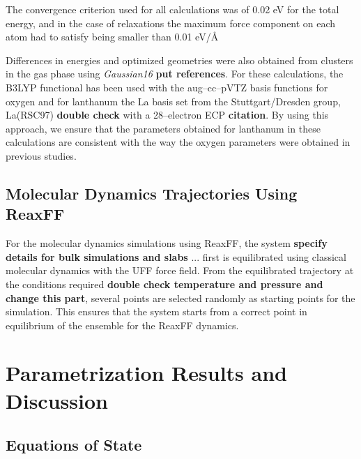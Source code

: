 \documentclass[journal=jpcafh,manuscript=article]{achemso}
\begin{document}

The convergence criterion used for all calculations was of 0.02 eV for the total energy, and in the case of relaxations the maximum force component on each atom had to satisfy being smaller than 0.01 eV/\AA 

Differences in energies and optimized geometries were also obtained from clusters in the gas phase using \emph{Gaussian16} \textbf{put references}.
For these calculations, the B3LYP functional has been used with the aug--cc--pVTZ basis functions for oxygen and for lanthanum the La basis set from the Stuttgart/Dresden group, La(RSC97) \textbf{double check} with a 28--electron ECP \textbf{citation}.
By using this approach, we ensure that the parameters obtained for lanthanum in these calculations are consistent with the way the oxygen parameters were obtained in previous studies.

\subsection{Molecular Dynamics Trajectories Using ReaxFF}
\label{sec:md-details}

For the molecular dynamics simulations using ReaxFF, the system \textbf{specify details for bulk simulations and slabs} ... first is equilibrated using classical molecular dynamics with the UFF force field.
From the equilibrated trajectory at the conditions required \textbf{double check temperature and pressure and change this part}, several points are selected randomly as starting points for the simulation.
This ensures that the system starts from a correct point in equilibrium of the ensemble for the ReaxFF dynamics.

\section{Parametrization Results and Discussion}
\label{sec:results-and-discussion}

\subsection{Equations of State}
\end{document}
